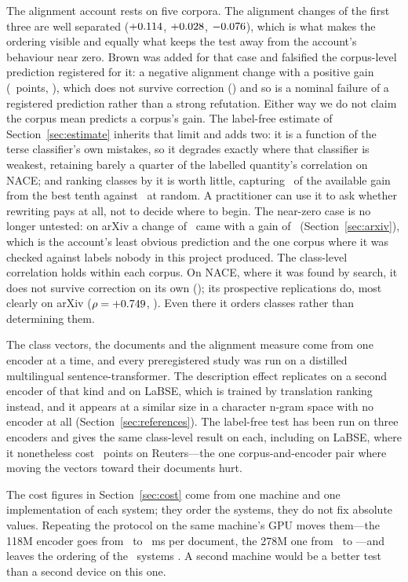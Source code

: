 \documentclass[11pt]{article}
\begin{document}
The alignment account rests on five corpora. The alignment changes of the first
three are well separated ($+0.114$, $+0.028$,
$-0.076$), which is what makes the ordering visible and equally what
keeps the test away from the account's behaviour near zero. Brown was added for
that case and falsified the corpus-level prediction registered for it: a
negative alignment change with a positive gain (\BrownDefGain~points,
\BrownDefPStat), which does not survive correction (\HolmBrownDefStat) and so
is a nominal failure of a registered prediction rather than a strong refutation.
Either way we do not claim the corpus mean predicts a corpus's gain. The
label-free estimate of Section~\ref{sec:estimate} inherits that limit and adds
two: it is a function of the terse classifier's own mistakes, so it degrades
exactly where that classifier is weakest, retaining barely a quarter of the
labelled quantity's correlation on NACE; and ranking classes by it is worth
little, capturing \EstimateTenth\ of the available gain from the best tenth
against \RandomTenth\ at random. A practitioner can use it to ask whether
rewriting pays at all, not to decide where to begin. The
near-zero case is no longer untested: on arXiv a change of \ArxivDescAlign\
came with a gain of \ArxivDescGain\ (Section~\ref{sec:arxiv}), which is the
account's least obvious prediction and the one corpus where it was checked
against labels nobody in this project produced. The class-level correlation holds within each corpus. On NACE, where it was
found by search, it does not survive correction on its own
(\HolmAlignStat); its prospective replications do, most clearly on arXiv
($\rho = +0.749$, \HolmArxivRhoStat). Even there it orders classes rather
than determining them.

The class vectors, the documents and the alignment measure come from one
encoder at a time, and every preregistered study was run on a distilled
multilingual sentence-transformer. The description effect replicates on a
second encoder of that kind and on LaBSE, which is trained by translation
ranking instead, and it appears at a similar size in a character n-gram space
with no encoder at all (Section~\ref{sec:references}). The label-free test has
been run on three encoders and gives the same class-level result on each,
including on LaBSE, where it nonetheless cost \RocchioLabseReutersGain~points on
Reuters---the one corpus-and-encoder pair where moving the vectors toward their
documents hurt.

The cost figures in Section~\ref{sec:cost} come from one machine and one
implementation of each system; they order the systems, they do not fix absolute
values. Repeating the protocol on the same machine's GPU moves them---the
118M encoder goes from \BenchMiniLMMs\ to \BenchOtherMiniLMMs~ms per document,
the 278M one from \BenchMpnetMs\ to \BenchOtherMpnetMs---and leaves the
ordering of the \BenchOtherSystems\ systems \BenchOrderingHolds. A second
machine would be a better test than a second device on this one.
\end{document}
